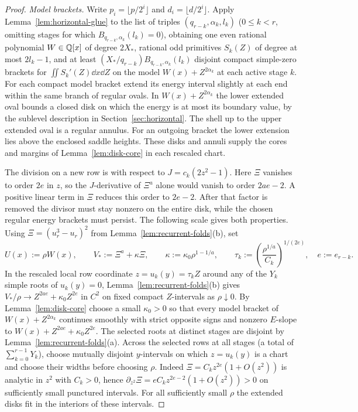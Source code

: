 \begin{proof}
\emph{Model brackets.}
Write $p_i=\lfloor p/2^i\rfloor$ and $d_i=\lfloor d/2^i\rfloor$. Apply Lemma~\ref{lem:horizontal-glue} to the list of triples $(q_{r-k},\alpha_k,l_k)$ ($0\le k<r$, omitting stages for which $B_{q_{r-k},\alpha_k}(l_k)=0$), obtaining one even rational polynomial $W\in\mathbb{Q}[x]$ of degree $2X_*$, rational odd primitives $S_k(Z)$ of degree at most $2l_k-1$, and at least $(X_*/q_{r-k})B_{q_{r-k},\alpha_k}(l_k)$ disjoint compact simple-zero brackets for $\iint S_k'(Z)\dd x\dd Z$ on the model $W(x)+Z^{2\alpha_k}$ at each active stage $k$. For each compact model bracket extend its energy interval slightly at each end within the same branch of regular ovals. In $W(x)+Z^{2\alpha_k}$ the lower extended oval bounds a closed disk on which the energy is at most its boundary value, by the sublevel description in Section~\ref{sec:horizontal}. The shell up to the upper extended oval is a regular annulus. For an outgoing bracket the lower extension lies above the enclosed saddle heights. These disks and annuli supply the cores and margins of Lemma~\ref{lem:disk-core} in each rescaled chart.

The division on a new row is with respect to \(J=c_k(2z^2-1)\). Here \(\Xi\) vanishes to order \(2e\) in \(z\), so the \(J\)-derivative of \(\Xi^a\) alone would vanish to order \(2ae-2\). A positive linear term in \(\Xi\) reduces this order to \(2e-2\). After that factor is removed the divisor must stay nonzero on the entire disk, while the chosen regular energy brackets must persist. The following scale gives both properties. Using \(\Xi=(u_r^3-u_r)^2\) from Lemma~\ref{lem:recurrent-folds}(b), set
\[
  U(x) := \rho W(x), \qquad V_* := \Xi^a + \kappa \Xi, \qquad
  \kappa := \kappa_0 \rho^{1-1/a}, \qquad
  \tau_k := \left(\frac{\rho^{1/a}}{C_k}\right)^{1/(2e)}, \quad e := e_{r-k}.
\]
In the rescaled local row coordinate $z=u_k(y)=\tau_k Z$ around any of the $Y_k$ simple roots of $u_k(y)=0$, Lemma~\ref{lem:recurrent-folds}(b) gives $V_*/\rho \to Z^{2ae}+\kappa_0 Z^{2e}$ in $C^2$ on fixed compact $Z$-intervals as $\rho\downarrow 0$. By Lemma~\ref{lem:disk-core} choose a small $\kappa_0>0$ so that every model bracket of $W(x)+Z^{2\alpha_k}$ continues smoothly with strict opposite signs and nonzero $E$-slope to $W(x)+Z^{2ae}+\kappa_0 Z^{2e}$. The selected roots at distinct stages are disjoint by Lemma~\ref{lem:recurrent-folds}(a). Across the selected rows at all stages (a total of $\sum_{k=0}^{r-1}Y_k$), choose mutually disjoint $y$-intervals on which $z=u_k(y)$ is a chart and choose their widths before choosing $\rho$. Indeed $\Xi=C_k z^{2e}(1+O(z^2))$ is analytic in $z^2$ with $C_k>0$, hence $\partial_{z^2}\Xi=e C_k z^{2e-2}(1+O(z^2))>0$ on sufficiently small punctured intervals. For all sufficiently small $\rho$ the extended disks fit in the interiors of these intervals.


\end{proof}
